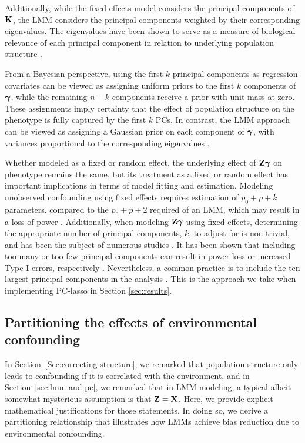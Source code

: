 Additionally, while the fixed effects model considers the principal components of $\mathbf{K}$, the LMM considers the principal components weighted by their corresponding eigenvalues. The eigenvalues have been shown to serve as a measure of biological relevance of each principal component in relation to underlying population structure \citep{hoffman2013correcting, price2006principal}. 

From a Bayesian perspective, using the first $k$ principal components as regression covariates can be viewed as assigning uniform priors to the first $k$ components of $\boldsymbol{\gamma}$, while the remaining $n - k$ components receive a prior with unit mass at zero. These assignments imply certainty that the effect of population structure on the phenotype is fully captured by the first $k$ PCs. In contrast, the LMM approach can be viewed as assigning a Gaussian prior on each component of $\boldsymbol{\gamma}$, with variances proportional to the corresponding eigenvalues \citep{astle2009population}. 



Whether modeled as a fixed or random effect, the underlying effect of $\mathbf{Z} \boldsymbol{\gamma}$ on phenotype remains the same, but its treatment as a fixed or random effect has important implications in terms of model fitting and estimation. Modeling unobserved confounding using fixed effects requires estimation of $p_0 + p + k$ parameters, compared to the $p_0 + p + 2$ required of an LMM, which may result in a loss of power \citep{zhang2015principal}. Additionally, when modeling $\mathbf{Z} \boldsymbol{\gamma}$ using fixed effects, determining the appropriate number of principal components, $k$, to adjust for is non-trivial, and has been the subject of numerous studies \citep{patterson2006population, zhao2018practical}. It has been shown that including too many or too few principal components can result in power loss or increased Type I errors, respectively \citep{zhang2015principal}. Nevertheless, a common practice is to include the ten largest principal components in the analysis \citep{zhao2018practical}. This is the approach we take when implementing PC-lasso in Section \ref{sec:results}.

\subsection{Partitioning the effects of environmental confounding}
\label{sec:partition}

In Section~\ref{Sec:correcting-structure}, we remarked that population structure only leads to confounding if it is correlated with the environment, and in Section~\ref{sec:lmm-and-pc}, we remarked that in LMM modeling, a typical albeit somewhat mysterious assumption is that $\mathbf{Z}=\mathbf{X}$.  Here, we provide explicit mathematical justifications for those statements.  In doing so, we derive a partitioning relationship that illustrates how LMMs achieve bias reduction due to environmental confounding.

